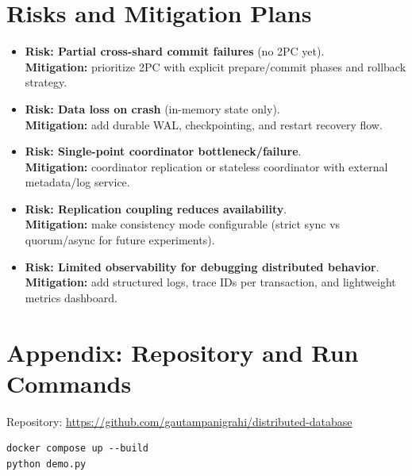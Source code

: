 \documentclass[11pt]{article}
\begin{document}
\section{Risks and Mitigation Plans}
\begin{itemize}[leftmargin=1.2em]
    \item \textbf{Risk: Partial cross-shard commit failures} (no 2PC yet).\\
    \textbf{Mitigation:} prioritize 2PC with explicit prepare/commit phases and rollback strategy.

    \item \textbf{Risk: Data loss on crash} (in-memory state only).\\
    \textbf{Mitigation:} add durable WAL, checkpointing, and restart recovery flow.

    \item \textbf{Risk: Single-point coordinator bottleneck/failure}.\\
    \textbf{Mitigation:} coordinator replication or stateless coordinator with external metadata/log service.

    \item \textbf{Risk: Replication coupling reduces availability}.\\
    \textbf{Mitigation:} make consistency mode configurable (strict sync vs quorum/async for future experiments).

    \item \textbf{Risk: Limited observability for debugging distributed behavior}.\\
    \textbf{Mitigation:} add structured logs, trace IDs per transaction, and lightweight metrics dashboard.
\end{itemize}

\section*{Appendix: Repository and Run Commands}
Repository: \url{https://github.com/gautampanigrahi/distributed-database}

\begin{Verbatim}[fontsize=\small,frame=single]
docker compose up --build
python demo.py
\end{Verbatim}
\end{document}
